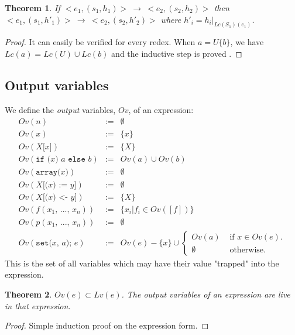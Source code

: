 \documentclass[12pt,a4paper]{article}
\newcommand{\cl}[1]{\texttt{#1}}
\newtheorem{theorem}{Theorem}
\newcommand{\ucont}[1]{\{#1\}}
\begin{document}
\begin{theorem}
If $<e_1, (s_1, h_1)> \ \longrightarrow \ <e_2, (s_2, h_2)>$ then $<e_1, (s_1, h'_1)> \ \longrightarrow \ <e_2, (s_2, h'_2)>$ where $h'_i = h_i|_{Lc(S_1)(e_1)}$.
\end{theorem}
\begin{proof}
It can easily be verified for every redex. When $a = U\ucont{b}$, we have $Lc(a) = Lc(U) \cup Lc(b)$ and the inductive step is proved .
\end{proof}


\subsection{Output variables}

We define the \emph{output} variables, $Ov$, of an expression:
\begin{eqnarray*}
Ov( n ) & := & \emptyset \\
Ov( x ) & := & \{ x \} \\
Ov( X\cl{[}x\cl{]} ) & := & \{ X \} \\
Ov( \cl{if (} x \cl{) } a \cl{ else } b ) & := & Ov(a) \cup Ov(b) \\
Ov( \cl{array(} x \cl{)} ) & := & \emptyset \\
Ov( X \cl{[(} x \cl{) := } y \cl{]} ) & := & \emptyset \\
Ov( X \cl{[(} x \cl{) <- } y \cl{]} ) & := & \{ X \} \\
Ov( f(x_1 \cl{, } ... \cl{, } x_n) ) & := & \{ x_i | f_i \in Ov([f]) \} \\
Ov( p(x_1 \cl{, } ... \cl{, } x_n) ) & := & \emptyset \\
Ov( \cl{set(} x \cl{, } a \cl{); } e ) &:=& Ov(e) - \{x\} \cup \left\lbrace \begin{array}{ll}
Ov(a) & \text{ if $x \in Ov(e)$.} \\
\emptyset & \text{ otherwise.}
\end{array} \right.
\end{eqnarray*}
This is the set of all variables which may have their value "trapped" into the expression.

\begin{theorem}
$Ov(e) \subset Lv(e)$. The output variables of an expression are live in that expression.
\end{theorem}
\begin{proof}
Simple induction proof on the expression form.
\end{proof}
\end{document}
